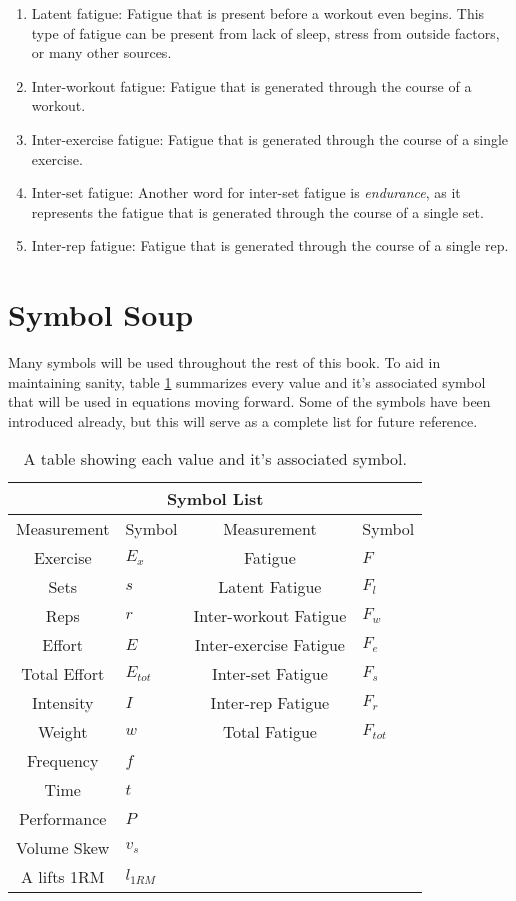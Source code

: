 \begin{enumerate}
	\item Latent fatigue: Fatigue that is present before a workout even begins. This type of fatigue can be present from lack of sleep, stress from outside factors, or many other sources.
	\item Inter-workout fatigue: Fatigue that is generated through the course of a workout.
	\item Inter-exercise fatigue: Fatigue that is generated through the course of a single exercise.
	\item Inter-set fatigue: Another word for inter-set fatigue is \textit{endurance}, as it represents the fatigue that is generated through the course of a single set.
	\item Inter-rep fatigue: Fatigue that is generated through the course of a single rep.
\end{enumerate}


\section{Symbol Soup}
\label{sec:P1_SymbolList}

Many symbols will be used throughout the rest of this book. To aid in maintaining sanity, table \ref{tab:P1_SymbolTable} summarizes every value and it's associated symbol that will be used in equations moving forward. Some of the symbols have been introduced already, but this will serve as a complete list for future reference.

\begin{table}[h]
	\centering
    \begin{tabular}{|c|l||c|l|}
	    	\hline
	    \multicolumn{4}{|c|}{Symbol List} \\
	    \hline
        Measurement & Symbol & Measurement & Symbol\\
        \hline
        Exercise & $E_x$ & Fatigue & $F$ \\
        Sets & $s$ & Latent Fatigue & $F_l$ \\
        Reps & $r$ & Inter-workout Fatigue & $F_w$ \\
        Effort & $E$ & Inter-exercise Fatigue & $F_e$ \\
        Total Effort & $E_{tot}$ & Inter-set Fatigue & $F_s$ \\
        Intensity & $I$ & Inter-rep Fatigue & $F_r$ \\
        Weight & $w$ & Total Fatigue & $F_{tot}$ \\
        Frequency & $f$ & & \\
        Time & $t$ & & \\
        Performance & $P$ & & \\
        Volume Skew & $v_s$ & & \\
        A lifts 1RM & $l_{1RM}$ & & \\
        \hline
    \end{tabular}
    \caption{A table showing each value and it's associated symbol.}
    \label{tab:P1_SymbolTable}
\end{table}